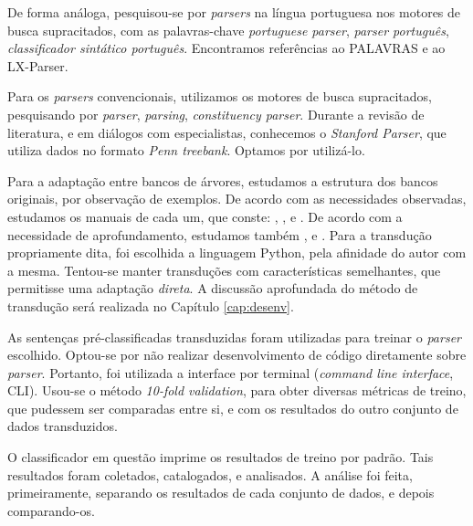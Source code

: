 De forma análoga, pesquisou-se por \textit{parsers} na língua portuguesa nos motores de busca supracitados, com as palavras-chave \textit{portuguese parser}, \textit{parser português}, \textit{classificador sintático português}. Encontramos referências ao PALAVRAS e ao LX-Parser.

Para os \textit{parsers} convencionais, utilizamos os motores de busca supracitados, pesquisando por \textit{parser}, \textit{parsing}, \textit{constituency parser}. Durante a revisão de literatura, e em diálogos com especialistas, conhecemos o \textit{Stanford Parser}, que utiliza dados no formato \textit{Penn treebank}. Optamos por utilizá-lo.

Para a adaptação entre bancos de árvores, estudamos a estrutura dos bancos originais, por observação de exemplos. De acordo com as necessidades observadas, estudamos os manuais de cada um, que conste: \cite{bracketing_ptb}, \cite{buildingPTB}, \cite{freitas2007biblia} e \cite{siteLxParser}. De acordo com a necessidade de aprofundamento, estudamos também \cite{afonso2006arvores}, \cite{bracketing_ptb} e \cite{cintil_handbook}. Para a transdução propriamente dita, foi escolhida a linguagem Python, pela afinidade do autor com a mesma. Tentou-se manter transduções com características semelhantes, que permitisse uma adaptação \textit{direta}. 
A discussão aprofundada do método de transdução será realizada no Capítulo \ref{cap:desenv}.

As sentenças pré-classificadas transduzidas foram utilizadas para treinar o \textit{parser} escolhido. Optou-se por não realizar desenvolvimento de código diretamente sobre \textit{parser}. Portanto, foi utilizada a interface por terminal (\textit{command line interface}, CLI). Usou-se o método \textit{10-fold validation}, para obter diversas métricas de treino, que pudessem ser comparadas entre si, e com os resultados do outro conjunto de dados transduzidos.

O classificador em questão imprime os resultados de treino por padrão. Tais resultados foram coletados, catalogados, e analisados. A análise foi feita, primeiramente, separando os resultados de cada conjunto de dados, e depois comparando-os.